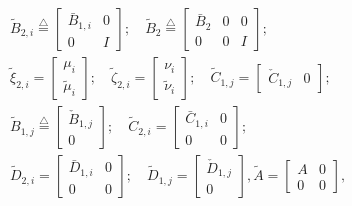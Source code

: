 \documentclass[twocolumn]{autart}
\newcommand{\eqdef}{\stackrel{\triangle}{=}}
\begin{document}
\begin{small}
\begin{equation}
\label{eqnstate}
\begin{split}
&\tilde{B}_{2,i} \eqdef \left[
\begin{array}{cc}
\bar{B}_{1,i} & 0 \\
0 & I
\end{array}\right];\quad \tilde{B}_{2} \eqdef \left[
\begin{array}{ccc}
\bar{B}_2 & 0 & 0\\
0 & 0 & I
\end{array}\right];\\
&\tilde{\xi}_{2,i}=\left[
\begin{array}{c}
\mu_i \\
\tilde{\mu}_i
\end{array}\right];\quad \tilde{\zeta}_{2,i}=\left[
\begin{array}{c}
\nu_i \\
\tilde{\nu}_i
\end{array}\right];\quad \tilde{C}_{1,j}=\left[
\begin{array}{ccc}
\check{C}_{1,j} & 0
\end{array}\right];\\
&\tilde{B}_{1,j} \eqdef \left[
\begin{array}{c}
\check{B}_{1,j} \\
0
\end{array}\right];\quad \tilde{C}_{2,i}=\left[
\begin{array}{ccc}
\bar{C}_{1,i} & 0 \\
0 & 0 
\end{array}\right];\\
&\tilde{D}_{2,i}=\left[
\begin{array}{ccc}
\bar{D}_{1,i} & 0 \\
0 & 0 
\end{array}\right];\quad \tilde{D}_{1,j}=\left[
\begin{array}{c}
\check{D}_{1,j} \\
0
\end{array}\right],
\tilde{A}=\left[
\begin{array}{cc}
A & 0 \\
0 & 0
\end{array}\right],
\end{split}
\end{equation}
\end{small}
\end{document}
